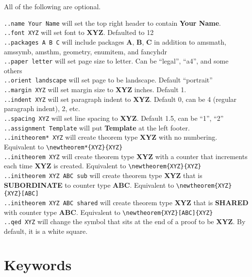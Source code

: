 \documentclass[12pt]{article}
\begin{document}
\begin{flushleft}
\bigskip
\bigskip

All of the following are optional.

\verb|..name Your Name| will set the top right header to contain \textbf{Your Name}. \\
\verb|..font XYZ| will set font to \textbf{XYZ}. Defaulted to 12 \\
\verb|..packages A B C| will include packages \textbf{A}, \textbf{B}, \textbf{C} in addition to amsmath, amssymb, amsthm, geometry, enumitem, and fancyhdr \\
\verb|..paper letter| will set page size to letter. Can be ``legal'', ``a4'', and some others\\
\verb|..orient landscape| will set page to be landscape. Default ``portrait''\\
\bigskip
\verb|..margin XYZ| will set margin size to \textbf{XYZ} inches. Default 1.\\
\verb|..indent XYZ| will set paragraph indent to \textbf{XYZ}. Default 0, can be 4 (regular paragraph indent), 2, etc. \\
\verb|..spacing XYZ| will set line spacing to \textbf{XYZ}. Default 1.5, can be ``1'', ``2''\\
\verb|..assignment Template| will put \textbf{Template} at the left footer. \\
\bigskip
\verb|..initheorem* XYZ| will create theorem type \textbf{XYZ} with no numbering. Equivalent to \verb|\newtheorem*{XYZ}{XYZ}|\\
\verb|..initheorem XYZ| will create theorem type \textbf{XYZ} with a counter that increments each time \textbf{XYZ} is created. Equivalent to \verb|\newtheorem{XYZ}{XYZ}|\\
\verb|..initheorem XYZ ABC sub| will create theorem type \textbf{XYZ} that is \textbf{SUBORDINATE} to counter type \textbf{ABC}. Equivalent to \verb|\newtheorem{XYZ}{XYZ}[ABC]|\\
\verb|..initheorem XYZ ABC shared| will create theorem type \textbf{XYZ} that is \textbf{SHARED} with counter type \textbf{ABC}. Equivalent to \verb|\newtheorem{XYZ}[ABC]{XYZ}|\\
\verb|..qed XYZ| will change the symbol that sits at the end of a proof to be \textbf{XYZ}. By default, it is a white square.

\newpage

\section*{Keywords}


\end{flushleft}
\end{document}
